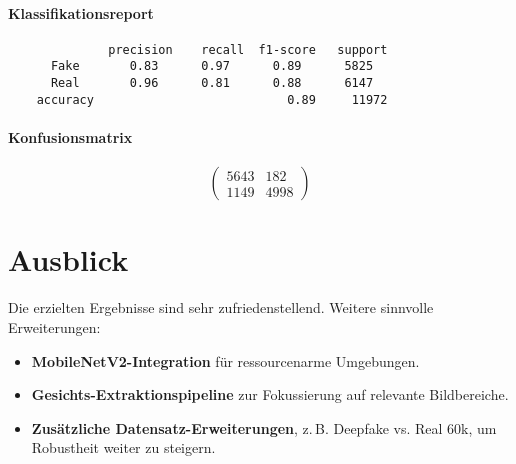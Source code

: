 \paragraph{Klassifikationsreport}
\begin{verbatim}
              precision    recall  f1-score   support
      Fake       0.83      0.97      0.89      5825
      Real       0.96      0.81      0.88      6147
    accuracy                           0.89     11972
\end{verbatim}

\paragraph{Konfusionsmatrix}
\[
\begin{pmatrix}
5643 &  182\\
1149 & 4998
\end{pmatrix}
\]

\section{Ausblick}
Die erzielten Ergebnisse sind sehr zufriedenstellend. Weitere sinnvolle Erweiterungen:
\begin{itemize}
  \item \textbf{MobileNetV2-Integration} für ressourcenarme Umgebungen.
  \item \textbf{Gesichts-Extraktionspipeline} zur Fokussierung auf relevante Bildbereiche.
  \item \textbf{Zusätzliche Datensatz-Erweiterungen}, z.\,B. Deepfake vs. Real 60k, um Robustheit weiter zu steigern.
\end{itemize}
